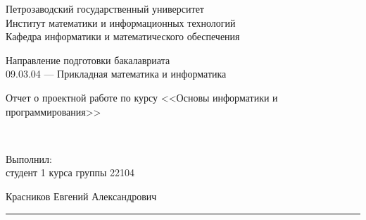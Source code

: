 \documentclass[a4paper,12pt]{article}
\newcommand{\myrule}[1]{\rule{#1}{0.4pt}}
\newcommand{\sign}[2][~]{{\small\myrule{#2}\\[-0.7em]\makebox[#2]{\it #1}}}
\renewcommand{\baselinestretch}{1.50}
\begin{document}

\thispagestyle{empty}
\begin{center}


    \renewcommand{\baselinestretch}{1}
    {\large
        {\sc Петрозаводский государственный университет\\
            Институт математики и информационных технологий\\
            Кафедра информатики и математического обеспечения
        }
    }

\end{center}


\begin{center}
    Направление подготовки бакалавриата \\
    09.03.04 --- Прикладная математика и информатика \\
\end{center}

\vfill

\begin{center}

    {\normalsize
        Отчет о проектной работе по курсу <<Основы информатики и программирования>>}
    \medskip


    {\Large {}} \\
\end{center}

\medskip

\begin{flushright}
    \parbox{11cm}{%
        \renewcommand{\baselinestretch}{1.2}
        \normalsize
        Выполнил:\\

        студент 1 курса группы 22104
        \begin{flushright}
            Красников Евгений Александрович \sign[подпись]{4cm}
        \end{flushright}


    }
\end{flushright}
\end{document}
